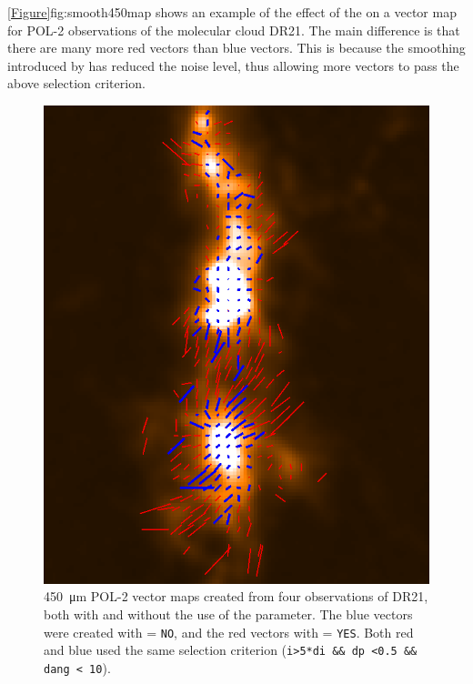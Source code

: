 \cref{Figure}{fig:smooth450map}{} shows an example of the effect of the  on a vector map for POL-2 observations of the molecular cloud DR21. The main difference is that there are many more red vectors than blue vectors. This is because the smoothing introduced by  has reduced the noise level, thus allowing more vectors to pass the above selection criterion.

\begin{figure}[ht!]
\begin{center}
\includegraphics[width=0.46\linewidth]{sc22-smooth450-450nosmo-1.png}
\caption [Example vector map showing the effect of the \poltwomap\  parameter.]{
  \SI{450}{\micro\metre} POL-2 vector maps created from four observations of DR21, both with and without the use of the  parameter. The blue vectors were created with  = \texttt{NO}, and the red vectors with  = \texttt{YES}. Both red and blue used the same selection criterion (\texttt{i>5*di \&\& dp <0.5 \&\& dang < 10}).
\label{fig:smooth450map}
}
\end{center}
\end{figure}

